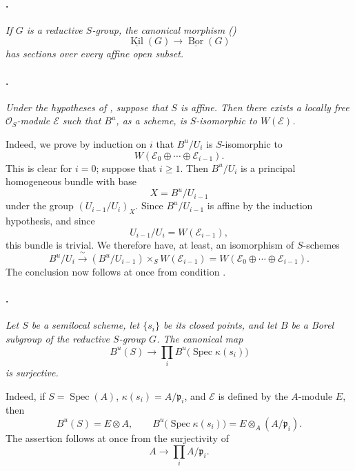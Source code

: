 \paragraph{.}
{\itshape If \(G\) is a reductive \(S\)-group, the canonical
morphism \textup{()}
\[
  \underline{\operatorname{Kil}}(G)
  \longrightarrow
  \underline{\operatorname{Bor}}(G)
\]
has sections over every affine open subset.}

\paragraph{.}
{\itshape Under the hypotheses of , suppose that \(S\) is
affine. Then there exists a locally free \(\mathcal O_S\)-module
\(\mathcal E\) such that \(B^u\), as a scheme, is \(S\)-isomorphic
to \(W(\mathcal E)\).}

Indeed, we prove by induction on \(i\) that \(B^u/U_i\) is \(S\)-isomorphic
to
\[
  W(\mathcal E_0\oplus\cdots\oplus\mathcal E_{i-1}).
\]
This is clear for \(i=0\); suppose that \(i\geq1\). Then
\(B^u/U_i\) is a principal homogeneous bundle with base
\[
  X=B^u/U_{i-1}
\]
under the group \((U_{i-1}/U_i)_X\). Since \(B^u/U_{i-1}\) is
affine by the induction hypothesis, and since
\[
  U_{i-1}/U_i=W(\mathcal E_{i-1}),
\]
this bundle is trivial. We therefore have, at least, an isomorphism
of \(S\)-schemes
\[
  B^u/U_i
  \xrightarrow{\;\sim\;}
  (B^u/U_{i-1})\times_S W(\mathcal E_{i-1})
  =
  W(\mathcal E_0\oplus\cdots\oplus\mathcal E_{i-1}).
\]
The conclusion now follows at once from condition
\textup{}.

\paragraph{.}
{\itshape Let \(S\) be a semilocal scheme, let \(\{s_i\}\) be its
closed points, and let \(B\) be a Borel subgroup of the reductive
\(S\)-group \(G\). The canonical map
\[
  B^u(S)
  \longrightarrow
  \prod_i B^u\bigl(\operatorname{Spec}\kappa(s_i)\bigr)
\]
is surjective.}

Indeed, if \(S=\operatorname{Spec}(A)\),
\(\kappa(s_i)=A/\mathfrak p_i\), and \(\mathcal E\) is defined by
the \(A\)-module \(E\), then
\[
  B^u(S)=E\otimes A,
  \qquad
  B^u\bigl(\operatorname{Spec}\kappa(s_i)\bigr)
  =
  E\otimes_A(A/\mathfrak p_i).
\]
The assertion follows at once from the surjectivity of
\[
  A\longrightarrow\prod_i A/\mathfrak p_i.
\]

